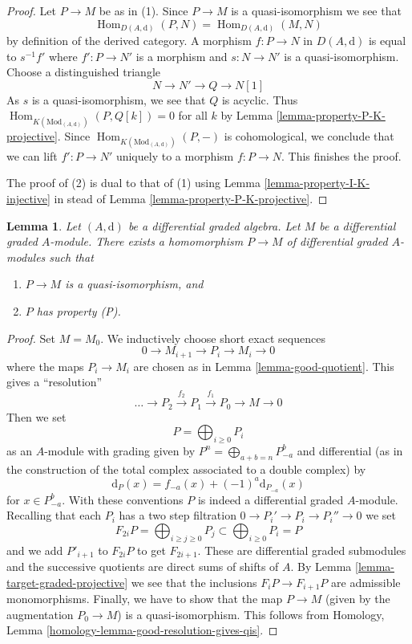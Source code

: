 \documentclass{stacks-project}
\theoremstyle{plain}
\newtheorem{lemma}[subsection]{Lemma}
\theoremstyle{definition}
\theoremstyle{remark}
\numberwithin{equation}{subsection}
\def\Hom{\mathop{\mathrm{Hom}}\nolimits}
\begin{document}
\begin{proof}
Let $P \to M$ be as in (1). Since $P \to M$ is a quasi-isomorphism we see that
$$
\Hom_{D(A, \text{d})}(P, N) = \Hom_{D(A, \text{d})}(M, N)
$$
by definition of the derived category. A morphism
$f : P \to N$ in $D(A, \text{d})$ is equal to
$s^{-1}f'$ where $f' : P \to N'$ is a morphism and
$s : N \to N'$ is a quasi-isomorphism. Choose a distinguished triangle
$$
N \to N' \to Q \to N[1]
$$
As $s$ is a quasi-isomorphism, we see that $Q$ is acyclic. Thus
$\Hom_{K(\text{Mod}_{(A, \text{d})})}(P, Q[k]) = 0$ for all $k$ by
Lemma \ref{lemma-property-P-K-projective}. Since
$\Hom_{K(\text{Mod}_{(A, \text{d})})}(P, -)$
is cohomological, we conclude that we can lift $f' : P \to N'$
uniquely to a morphism $f : P \to N$. This finishes the proof.

\medskip\noindent
The proof of (2) is dual to that of (1) using
Lemma \ref{lemma-property-I-K-injective} in stead of
Lemma \ref{lemma-property-P-K-projective}.
\end{proof}

\begin{lemma}
\label{lemma-resolve}
Let $(A, \text{d})$ be a differential graded algebra.
Let $M$ be a differential graded $A$-module. There exists a homomorphism
$P \to M$ of differential graded $A$-modules such that
\begin{enumerate}
\item $P \to M$ is a quasi-isomorphism, and
\item $P$ has property (P).
\end{enumerate}
\end{lemma}

\begin{proof}
Set $M = M_0$. We inductively choose short exact sequences
$$
0 \to M_{i + 1} \to P_i \to M_i \to 0
$$
where the maps $P_i \to M_i$ are chosen as in Lemma \ref{lemma-good-quotient}.
This gives a ``resolution''
$$
\ldots \to P_2 \xrightarrow{f_2} P_1 \xrightarrow{f_1} P_0 \to M \to 0
$$
Then we set
$$
P = \bigoplus\nolimits_{i \geq 0} P_i
$$
as an $A$-module with grading given by
$P^n = \bigoplus_{a + b = n} P_{-a}^b$ and
differential (as in the construction of the total complex associated
to a double complex) by
$$
\text{d}_P(x) = f_{-a}(x) + (-1)^a \text{d}_{P_{-a}}(x)
$$
for $x \in P_{-a}^b$. With these conventions $P$ is indeed a differential
graded $A$-module. Recalling that each $P_i$ has a two step filtration
$0 \to P_i' \to P_i \to P_i'' \to 0$ we set
$$
F_{2i}P = \bigoplus\nolimits_{i \geq j \geq 0} P_j
\subset
\bigoplus\nolimits_{i \geq 0} P_i = P
$$
and we add $P'_{i + 1}$ to $F_{2i}P$ to get $F_{2i + 1}$.
These are differential graded submodules and the successive quotients
are direct sums of shifts of $A$. By
Lemma \ref{lemma-target-graded-projective} we see that
the inclusions $F_iP \to F_{i + 1}P$ are admissible monomorphisms.
Finally, we have to show that the map $P \to M$ (given by the
augmentation $P_0 \to M$) is a quasi-isomorphism. This follows from
Homology, Lemma \ref{homology-lemma-good-resolution-gives-qis}.
\end{proof}
\end{document}
